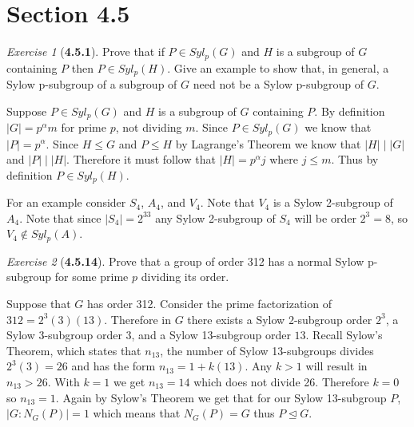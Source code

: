 \documentclass[12pt]{amsart}
\makeatletter
\theoremstyle{remark}
\newtheorem*{exercise}{Exercise}%
\renewenvironment{proof}[1][\proofname]{\par\doublespacing
  \pushQED{\qed}%
  \normalfont \topsep6\p@\@plus6\p@\relax
  \list{}{%
    \settowidth{\leftmargin}{\itshape\proofname:\hskip\labelsep}%
    \setlength{\labelwidth}{0pt}%
    \setlength{\itemindent}{-\leftmargin}%
  }%
  \item[\hskip\labelsep\itshape#1\@addpunct{:}]\ignorespaces
}{%
  \popQED\endlist\@endpefalse
  \singlespacing
}
\theoremstyle{mycomment}
\makeatother
\begin{document}
\section*{\textbf{Section 4.5}}

\begin{exercise}[\textbf{4.5.1}] Prove that if $P \in Syl_p(G)$ and $H$ is a subgroup of $G$ containing $P$ 
  then $P \in Syl_p(H)$. Give an example to show that, in general, a Sylow p-subgroup of a subgroup of $G$ need not 
  be a Sylow p-subgroup of $G$. 
  \begin{proof} Suppose $P \in Syl_p(G)$ and $H$ is a subgroup of $G$ containing $P$. By definition 
    $|G| = p^{\alpha}m$ for prime $p$, not dividing $m$. Since $P \in Syl_p(G)$ we know that $|P| = p^{\alpha}$.
    Since $H \leq G$ and $P \leq H$ by Lagrange's Theorem we know that $|H|\mid|G|$ and $|P|\mid |H|$. Therefore 
    it must follow that $|H| = p^{\alpha}j$ where $j \leq m$. Thus by definition $P \in Syl_p(H)$.


    For an example consider $S_4$, $A_4$, and $V_4$. Note that $V_4$ is a Sylow 2-subgroup of $A_4$. Note that 
    since $|S_4| =2^33$ any Sylow 2-subgroup of $S_4$ will be order $2^3 = 8$, so $V_4 \not\in Syl_p(A)$. 
    \end{proof}
\end{exercise}
\vspace{.15in}



\begin{exercise}[\textbf{4.5.14}] Prove that a group of order 312 has a normal Sylow p-subgroup for some 
  prime $p$ dividing its order.
   \begin{proof} Suppose that $G$ has order 312. Consider the prime factorization of $312 = 2^3(3)(13)$. 
    Therefore in $G$ there exists a Sylow 2-subgroup order $2^3$, a Sylow 3-subgroup order $3$, 
    and a Sylow 13-subgroup order $13$. Recall Sylow's Theorem, which states that $n_{13}$, the number of 
    Sylow 13-subgroups divides $2^3(3) = 26$ and has the form $n_{13} = 1 + k(13)$. Any $k>1$ will result in $n_{13}>26$.
    With $k = 1$ we get $n_{13} = 14$ which does not divide 26. Therefore $k = 0$ so $n_{13} = 1$. Again by Sylow's Theorem 
    we get that for our Sylow 13-subgroup $P$, $|G:N_G(P)| = 1$ which means that $N_G(P) = G$ thus $P \trianglelefteq G$.  
    \end{proof}
\end{exercise}
\vspace{.15in}
\end{document}
